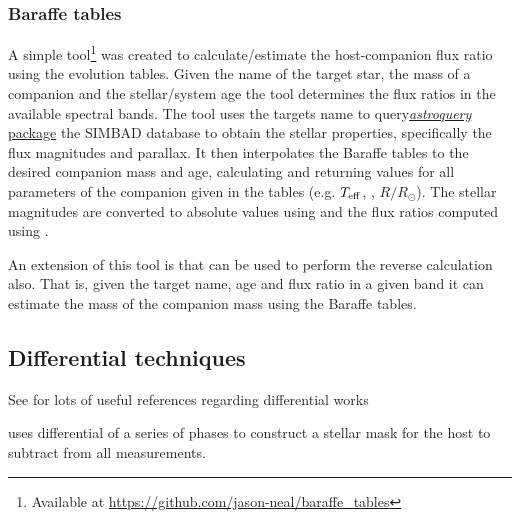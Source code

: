 \subsubsection{Baraffe tables}
\label{subsubsec:baraffe_tables_code}
A simple tool\footnote{Available at \url{https://github.com/jason-neal/baraffe_tables}} was created to calculate/estimate the host-companion flux ratio using the \citet{baraffe_evolutionary_2003,baraffe_new_2015} evolution tables.
Given the name of the target star, the mass of a companion and the stellar/system age the tool determines the flux ratios in the available spectral bands.
The tool uses the targets name to query\href{https://zenodo.org/record/1160627}{\emph{astroquery} package} the {SIMBAD} database to obtain the stellar properties, specifically the flux magnitudes and parallax. It then interpolates the Baraffe tables to the desired companion mass and age, calculating and returning values for all parameters of the companion given in the tables (e.g. \(T_{\mathrm{eff}}\), \logg, \(R/R_{\odot}\)).
The stellar magnitudes are converted to absolute values using  and the flux ratios computed using  .

An extension of this tool is that can be used to perform the reverse calculation also. That is, given the target name, age and flux ratio in a given band it can estimate the mass of the companion mass using the Baraffe tables.










\subsection{Differential techniques}
See \citet{kostogryz_spectral_2013} for lots of useful references regarding differential works \citet{simon_disentangling_1994}

\citet{rodler_weighing_2012} uses differential of a series of phases to construct a stellar mask for the host to subtract from all measurements.
